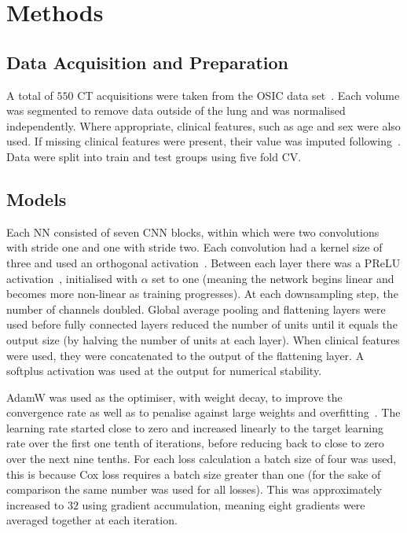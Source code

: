 \vspace{-0.5cm}

\section{Methods} \label{sec:methods}
    \subsection{Data Acquisition and Preparation} \label{sec:data_acquisition_and_preparation}
        A total of $550$ \gls{CT} acquisitions were taken from the \gls{OSIC} data set~\cite{OSICOSICRepository}. Each volume was segmented to remove data outside of the lung and was normalised independently. Where appropriate, clinical features, such as age and sex were also used. If missing clinical features were present, their value was imputed following~\cite{Shahin2022SurvivalData}. Data were split into train and test groups using five fold \gls{CV}.

    \vspace{-0.5cm}

    \subsection{Models} \label{sec:models}
        Each \gls{NN} consisted of seven \gls{CNN} blocks, within which were two convolutions with stride one and one with stride two. Each convolution had a kernel size of three and used an orthogonal activation~\cite{Hu2020ProvableNetworks}. Between each layer there was a \gls{PReLU} activation~\cite{He2015DelvingClassification}, initialised with $\alpha$ set to one (meaning the network begins linear and becomes more non-linear as training progresses). At each downsampling step, the number of channels doubled. Global average pooling and flattening layers were used before fully connected layers reduced the number of units until it equals the output size (by halving the number of units at each layer). When clinical features were used, they were concatenated to the output of the flattening layer. A softplus activation was used at the output for numerical stability.

        AdamW was used as the optimiser, with weight decay, to improve the convergence rate as well as to penalise against large weights and overfitting~\cite{Loshchilov2019DecoupledRegularization}. The learning rate started close to zero and increased linearly to the target learning rate over the first one tenth of iterations, before reducing back to close to zero over the next nine tenths. For each loss calculation a batch size of four was used, this is because Cox loss requires a batch size greater than one (for the sake of comparison the same number was used for all losses). This was approximately increased to $32$ using gradient accumulation, meaning eight gradients were averaged together at each iteration.


